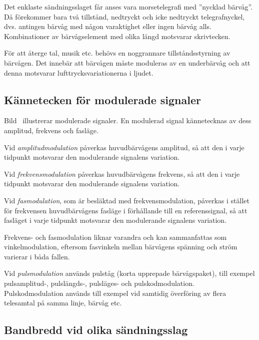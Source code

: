 Det enklaste sändningsslaget får anses vara morsetelegrafi med
''nycklad bärvåg''.
Då förekommer bara två tillstånd, nedtryckt och icke nedtryckt telegrafnyckel,
dvs. antingen bärvåg med någon varaktighet eller ingen bärvåg alls.
Kombinationer av bärvågselement med olika längd motsvarar skrivtecken.

För att återge tal, musik etc. behövs en noggrannare tillståndsstyrning av
bärvågen.
Det innebär att bärvågen måste moduleras av en underbärvåg och att denna
motsvarar lufttrycksvariationerna i ljudet.

\subsection{Kännetecken för modulerade signaler}
\label{kännetecken_modulerade_signaler}


Bild~ illustrerar modulerade signaler.
En modulerad signal kännetecknas av dess amplitud, frekvens och fasläge.

Vid \emph{amplitudmodulation} påverkas huvudbärvågens amplitud, så att den i
varje tidpunkt motsvarar den modulerande signalens variation.

Vid \emph{frekvensmodulation} påverkas huvudbärvågens frekvens, så att den i
varje tidpunkt motsvarar den modulerande signalens variation.

Vid \emph{fasmodulation}, som är besläktad med frekvensmodulation, påverkas i
stället för frekvensen huvudbärvågens fasläge i förhållande till en
referenssignal, så att fasläget i varje tidpunkt motsvarar den modulerande
signalens variation.

Frekvens- och fasmodulation liknar varandra och kan sammanfattas som
vinkelmodulation, eftersom fasvinkeln mellan bärvågens spänning och ström
varierar i båda fallen.

Vid \emph{pulsmodulation} används pulståg (korta upprepade bärvågspaket), till
exempel pulsamplitud-, pulslängds-, pulsläges- och pulskodmodulation.
Pulskodmodulation används till exempel vid samtidig överföring av flera
telesamtal på samma linje, bärvåg etc.


\subsection{Bandbredd vid olika sändningsslag}
\label{bandbredd_modulation}

